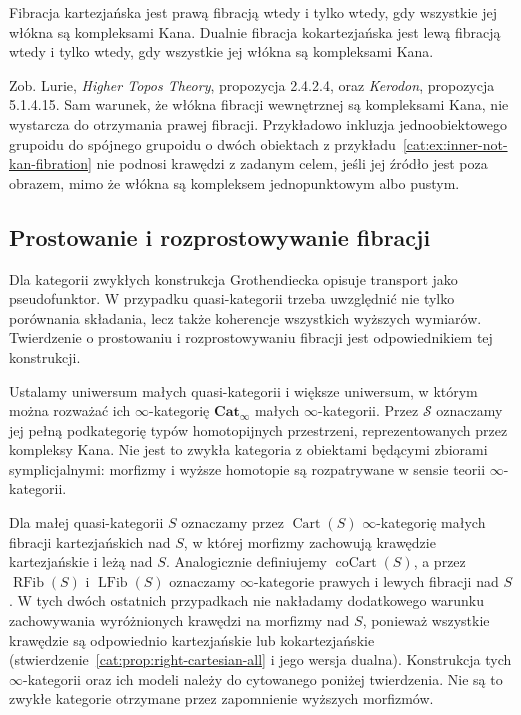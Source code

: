 \begin{twierdzenie}\label{cat:thm:cartesian-kan-fibers}
Fibracja kartezjańska jest prawą fibracją wtedy i tylko wtedy, gdy wszystkie jej włókna są kompleksami Kana. Dualnie fibracja kokartezjańska jest lewą fibracją wtedy i tylko wtedy, gdy wszystkie jej włókna są kompleksami Kana.
\end{twierdzenie}
Zob. Lurie, \emph{Higher Topos Theory}, propozycja 2.4.2.4, oraz \emph{Kerodon}, propozycja 5.1.4.15. Sam warunek, że włókna fibracji wewnętrznej są kompleksami Kana, nie wystarcza do otrzymania prawej fibracji. Przykładowo inkluzja jednoobiektowego grupoidu do spójnego grupoidu o dwóch obiektach z przykładu~\ref{cat:ex:inner-not-kan-fibration} nie podnosi krawędzi z zadanym celem, jeśli jej źródło jest poza obrazem, mimo że włókna są kompleksem jednopunktowym albo pustym.

\subsection{Prostowanie i rozprostowywanie fibracji}

Dla kategorii zwykłych konstrukcja Grothendiecka opisuje transport jako pseudofunktor. W przypadku quasi-kategorii trzeba uwzględnić nie tylko porównania składania, lecz także koherencje wszystkich wyższych wymiarów. Twierdzenie o prostowaniu i rozprostowywaniu fibracji jest odpowiednikiem tej konstrukcji.

Ustalamy uniwersum małych quasi-kategorii i większe uniwersum, w którym można rozważać ich $\infty$-kategorię $\mathbf{Cat}_{\infty}$ małych $\infty$-kategorii. Przez $\mathcal S$ oznaczamy jej pełną podkategorię typów homotopijnych przestrzeni, reprezentowanych przez kompleksy Kana. Nie jest to zwykła kategoria z obiektami będącymi zbiorami symplicjalnymi: morfizmy i wyższe homotopie są rozpatrywane w sensie teorii $\infty$-kategorii.

Dla małej quasi-kategorii $S$ oznaczamy przez $\operatorname{Cart}(S)$ $\infty$-kategorię małych fibracji kartezjańskich nad $S$, w której morfizmy zachowują krawędzie kartezjańskie i leżą nad $S$. Analogicznie definiujemy $\operatorname{coCart}(S)$, a przez $\operatorname{RFib}(S)$ i $\operatorname{LFib}(S)$ oznaczamy $\infty$-kategorie prawych i lewych fibracji nad $S$. W tych dwóch ostatnich przypadkach nie nakładamy dodatkowego warunku zachowywania wyróżnionych krawędzi na morfizmy nad $S$, ponieważ wszystkie krawędzie są odpowiednio kartezjańskie lub kokartezjańskie (stwierdzenie~\ref{cat:prop:right-cartesian-all} i jego wersja dualna). Konstrukcja tych $\infty$-kategorii oraz ich modeli należy do cytowanego poniżej twierdzenia. Nie są to zwykłe kategorie otrzymane przez zapomnienie wyższych morfizmów.

